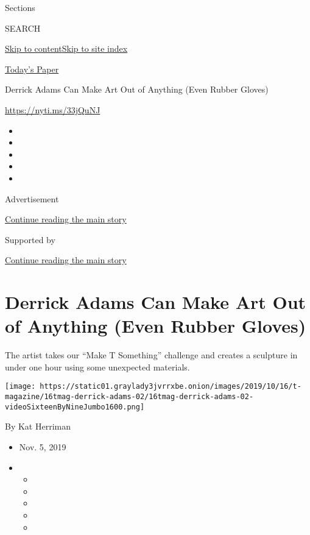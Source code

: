 Sections

SEARCH

\protect\hyperlink{site-content}{Skip to
content}\protect\hyperlink{site-index}{Skip to site index}

\href{https://myaccount.nytimes3xbfgragh.onion/auth/login?response_type=cookie\&client_id=vi}{}

\href{https://www.nytimes3xbfgragh.onion/section/todayspaper}{Today's
Paper}

Derrick Adams Can Make Art Out of Anything (Even Rubber Gloves)

\url{https://nyti.ms/33jQuNJ}

\begin{itemize}
\item
\item
\item
\item
\item
\end{itemize}

Advertisement

\protect\hyperlink{after-top}{Continue reading the main story}

Supported by

\protect\hyperlink{after-sponsor}{Continue reading the main story}

\hypertarget{derrick-adams-can-make-art-out-of-anything-even-rubber-gloves}{%
\section{Derrick Adams Can Make Art Out of Anything (Even Rubber
Gloves)}\label{derrick-adams-can-make-art-out-of-anything-even-rubber-gloves}}

The artist takes our ``Make T Something'' challenge and creates a
sculpture in under one hour using some unexpected materials.

\texttt{[image: https://static01.graylady3jvrrxbe.onion/images/2019/10/16/t-magazine/16tmag-derrick-adams-02/16tmag-derrick-adams-02-videoSixteenByNineJumbo1600.png]}

By Kat Herriman

\begin{itemize}
\item
  Nov. 5, 2019
\item
  \begin{itemize}
  \item
  \item
  \item
  \item
  \item
  \end{itemize}
\end{itemize}

